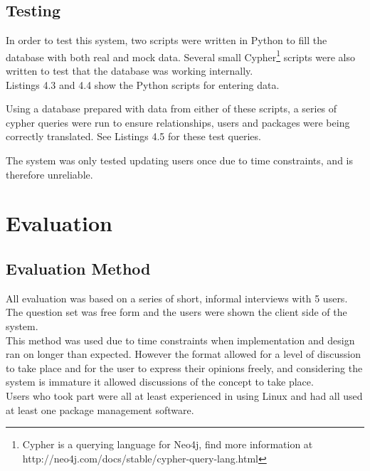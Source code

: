 \documentclass{l4proj}
\begin{document}
\section{Testing}
In order to test this system, two scripts were written in Python to fill the database with both real and mock data. Several small Cypher\footnote{Cypher is a querying language for Neo4j, find more information at http://neo4j.com/docs/stable/cypher-query-lang.html} scripts were also written to test that the database was working internally.\\
Listings 4.3 and 4.4 show the Python scripts for entering data.\\
\begin{figure}

\end{figure}
\begin{figure}

\end{figure}
Using a database prepared with data from either of these scripts, a series of cypher queries were run to ensure relationships, users and packages were being correctly translated. See Listings 4.5 for these test queries.\\
\begin{figure}

\end{figure}
The system was only tested updating users once due to time constraints, and is therefore unreliable.\\
 
 
\chapter{Evaluation}
\section{Evaluation Method}
All evaluation was based on a series of short, informal interviews with 5 users. The question set was free form and the users were shown the client side of the system.\\
This method was used due to time constraints when implementation and design ran on longer than expected. However the format allowed for a level of discussion to take place and for the user to express their opinions freely, and considering the system is immature it allowed discussions of the concept to take place.\\
Users who took part were all at least experienced in using Linux and had all used at least one package management software.\\ 
\end{document}
